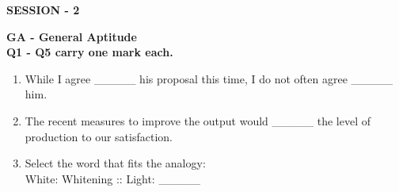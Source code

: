 \documentclass[12pt,onecolumn]{article}
\begin{document}
\pagebreak
\begin{center}
    \Large\textbf{SESSION - 2}\\
\end{center}
\noindent\large\textbf{GA - General Aptitude}\\
\normalsize\textbf{Q1 - Q5 carry one mark each.}
\begin{enumerate}
    \item While I agree \_\_\_\_\_ his proposal this time, I do not often agree \_\_\_\_\_ him.
          \begin{enumerate}
          \end{enumerate}

    \item The recent measures to improve the output would \_\_\_\_\_ the level of production to our satisfaction.
          \begin{enumerate}
          \end{enumerate}

    \item Select the word that fits the analogy:\\
          White: Whitening :: Light: \_\_\_\_\_
          \begin{enumerate}
          \end{enumerate}


\end{enumerate}
\end{document}
